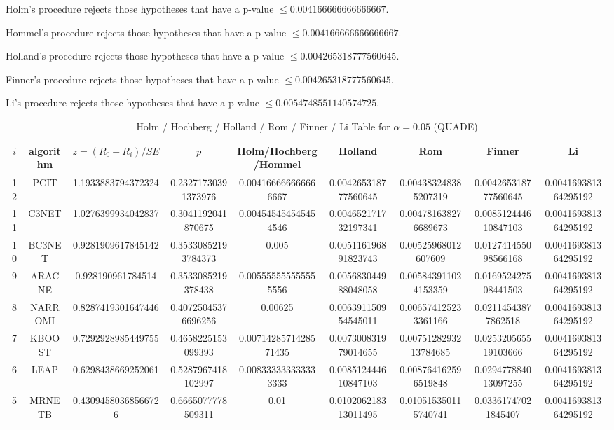 \documentclass[a4paper,10pt]{article}
\begin{document}
\begin{landscape}
Holm's procedure rejects those hypotheses that have a p-value $\le0.004166666666666667$.


Hommel's procedure rejects those hypotheses that have a p-value $\le0.004166666666666667$.


Holland's procedure rejects those hypotheses that have a p-value $\le0.004265318777560645$.


Finner's procedure rejects those hypotheses that have a p-value $\le0.004265318777560645$.


Li's procedure rejects those hypotheses that have a p-value $\le0.0054748551140574725$.



\newpage

\begin{table}[!htp]
\centering\scriptsize
\caption{Holm / Hochberg / Holland / Rom / Finner / Li Table for $\alpha=0.05$ (QUADE)}
\begin{tabular}{ccccccccc}
$i$&algorithm&$z=(R_0 - R_i)/SE$&$p$&Holm/Hochberg/Hommel&Holland&Rom&Finner&Li\\
\hline
12&PCIT&1.1933883794372324&0.23271730391373976&0.004166666666666667&0.004265318777560645&0.004383248385207319&0.004265318777560645&0.004169381364295192\\
11&C3NET&1.0276399934042837&0.3041192041870675&0.004545454545454546&0.004652171732197341&0.004781638276689673&0.008512444610847103&0.004169381364295192\\
10&BC3NET&0.9281909617845142&0.35330852193784373&0.005&0.005116196891823743&0.00525968012607609&0.012741455098566168&0.004169381364295192\\
9&ARACNE&0.928190961784514&0.3533085219378438&0.005555555555555556&0.005683044988048058&0.005843911024153359&0.016952427508441503&0.004169381364295192\\
8&NARROMI&0.8287419301647446&0.40725045376696256&0.00625&0.006391150954545011&0.006574125233361166&0.02114543877862518&0.004169381364295192\\
7&KBOOST&0.7292928985449755&0.4658225153099393&0.0071428571428571435&0.007300831979014655&0.0075128293213784685&0.025320565519103666&0.004169381364295192\\
6&LEAP&0.6298438669252061&0.5287967418102997&0.008333333333333333&0.008512444610847103&0.008764162596519848&0.029477884013097255&0.004169381364295192\\
5&MRNETB&0.43094580368566726&0.6665077778509311&0.01&0.010206218313011495&0.010515350115740741&0.03361747021845407&0.004169381364295192\\

\end{tabular}
\end{table}
\end{landscape}
\end{document}
